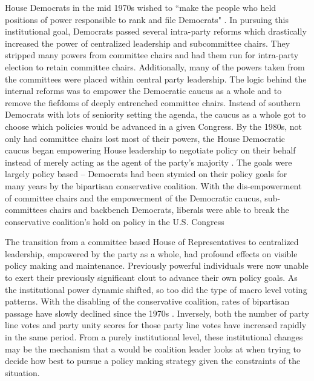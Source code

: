 \documentclass[12pt]{article}
\begin{document}
House Democrats in the mid 1970s wished to ``make the people who held positions of power responsible to rank and file Democrats" \citep[pg. 26, quote spoken by Rep. Donald Fraser (D-MN)]{rohde1991}. In pursuing this institutional goal, Democrats passed several intra-party reforms which drastically increased the power of centralized leadership and subcommittee chairs. They stripped many powers from committee chairs and had them run for intra-party election to retain committee chairs. Additionally, many of the powers taken from the committees were placed within central party leadership. The logic behind the internal reforms was to empower the Democratic caucus as a whole and to remove the fiefdoms of deeply entrenched committee chairs. Instead of southern Democrats with lots of seniority setting the agenda, the caucus as a whole got to choose which policies would be advanced in a given Congress. By the 1980s, not only had committee chairs lost most of their powers, the House Democratic caucus began empowering House leadership to negotiate policy on their behalf instead of merely acting as the agent of the party's majority \citep{sinclair1983, palazzolo1992, sinclair1998}. The goals were largely policy based -- Democrats had been stymied on their policy goals for many years by the bipartisan conservative coalition. With the dis-empowerment of committee chairs and the empowerment of the Democratic caucus, sub-committees chairs and backbench Democrats, liberals were able to break the conservative coalition's hold on policy in the U.S. Congress

The transition from a committee based House of Representatives to centralized leadership, empowered by the party as a whole, had profound effects on visible policy making and maintenance. Previously powerful individuals were now unable to exert their previously significant clout to advance their own policy goals. As the institutional power dynamic shifted, so too did the type of macro level voting patterns. With the disabling of the conservative coalition, rates of bipartisan passage have slowly declined since the 1970s \citep{trubowitz2005}. Inversely, both the number of party line votes and party unity scores for those party line votes have increased rapidly in the same period. From a purely institutional level, these institutional changes may be the mechanism that a would be coalition leader looks at when trying to decide how best to pursue a policy making strategy given the constraints of the situation.
\end{document}
